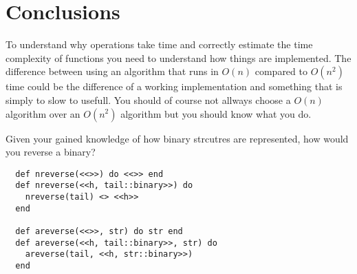 \documentclass[a4paper,11pt]{article}
\begin{document}
\section*{Conclusions}

To understand why operations take time and correctly estimate the time
complexity of functions you need to understand how things are
implemented. The difference between using an algorithm that runs in
$O(n)$ compared to $O(n^2)$ time could be the difference of a working
implementation and something that is simply to slow to usefull. You
should of course not allways choose a $O(n)$ algorithm over an
$O(n^2)$ algorithm but you should know what you do.

Given your gained knowledge of how binary strcutres are represented,
how would you reverse a binary?

\begin{verbatim}
  def nreverse(<<>>) do <<>> end
  def nreverse(<<h, tail::binary>>) do
    nreverse(tail) <> <<h>>
  end  

  def areverse(<<>>, str) do str end
  def areverse(<<h, tail::binary>>, str) do
    areverse(tail, <<h, str::binary>>)
  end    
\end{verbatim}
\end{document}
